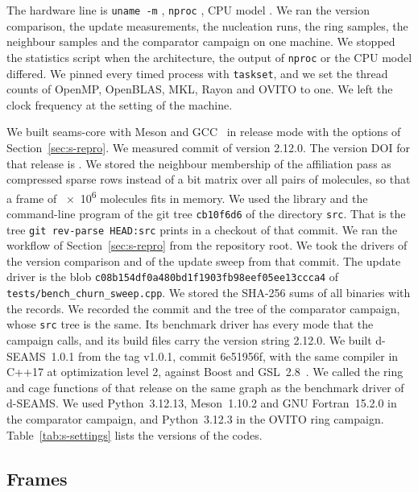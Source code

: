 \documentclass[preprint,12pt]{elsarticle}
\begin{document}
The hardware line is \texttt{uname -m} \texttt{}, \texttt{nproc} , CPU model \texttt{}.
We ran the version comparison, the update measurements, the nucleation runs, the ring samples, the neighbour samples and the comparator campaign on one machine.
We stopped the statistics script when the architecture, the output of \texttt{nproc} or the CPU model differed.
We pinned every timed process with \texttt{taskset}, and we set the thread counts of OpenMP, OpenBLAS, MKL, Rayon and OVITO to one.
We left the clock frequency at the setting of the machine.

We built seams-core with Meson and GCC~ in release mode with the options of Section~\ref{sec:s-repro}.
We measured commit \texttt{} of version 2.12.0.
The version DOI for that release is \DOIPENDING.
We stored the neighbour membership of the affiliation pass as compressed sparse rows instead of a bit matrix over all pairs of molecules, so that a frame of \num{e6} molecules fits in memory.
We used the library and the command-line program of the git tree \texttt{cb10f6d6} of the directory \texttt{src}.
That is the tree \texttt{git rev-parse HEAD:src} prints in a checkout of that commit.
We ran the workflow of Section~\ref{sec:s-repro} from the repository root.
We took the drivers of the version comparison and of the update sweep from that commit.
The update driver is the blob \texttt{c08b154df0a480bd1f1903fb98eef05ee13ccca4} of \texttt{tests/bench\_churn\_sweep.cpp}.
We stored the SHA-256 sums of all binaries with the records.
We recorded the commit and the tree of the comparator campaign, whose \texttt{src} tree is the same.
Its benchmark driver has every mode that the campaign calls, and its build files carry the version string 2.12.0.
We built d-SEAMS~1.0.1 from the tag v1.0.1, commit 6e51956f, with the same compiler in C++17 at optimization level 2, against Boost and GSL~2.8~\cite{dseams101}.
We called the ring and cage functions of that release on the same graph as the benchmark driver of d-SEAMS.
We used Python~3.12.13, Meson~1.10.2 and GNU Fortran~15.2.0 in the comparator campaign, and Python~3.12.3 in the OVITO ring campaign.
Table~\ref{tab:s-settings} lists the versions of the codes.

\subsection{Frames}
\label{sec:s-frames}
\end{document}
